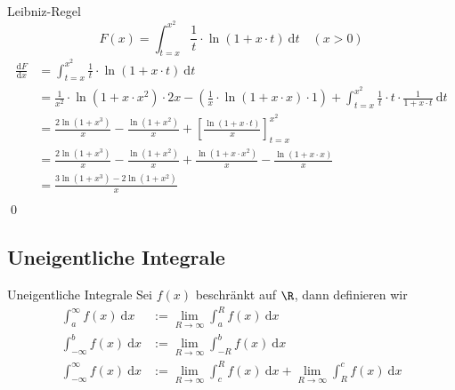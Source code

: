 \documentclass[german]{../spicker}
\newcommand{\dx}{~\mathrm{d}x}
\newcommand{\dt}{~\mathrm{d}t}
\newcommand{\dFdx}{\frac{\mathrm{d}F}{\mathrm{d}x}}
\begin{document}
\begin{example}{Leibniz-Regel}
    $$F(x) = \int_{t=x}^{x^2} \frac{1}{t} \cdot \ln (1 + x\cdot t) \dt \quad (x>0)$$
    $$
        \begin{aligned}
            \dFdx
             & ={} \int_{t=x}^{x^2} \frac{1}{t} \cdot \ln (1 + x\cdot t) \dt                                                                                                                                \\
             & ={} \frac{1}{x^2} \cdot \ln (1 + x\cdot x^2) \cdot 2x - \left( \frac{1}{x} \cdot \ln (1 + x\cdot x) \cdot 1 \right) + \int^{x^2}_{t=x} \frac{1}{t} \cdot t \cdot \frac{1}{1 + x \cdot t} \dt \\
             & ={} \frac{2\ln (1 + x^3)}{x} - \frac{\ln(1+x^2)}{x} + \left[ \frac{\ln(1+x\cdot t)}{x} \right]^{x^2}_{t=x}                                                                                   \\
             & ={} \frac{2\ln (1 + x^3)}{x} - \frac{\ln(1+x^2)}{x} + \frac{\ln(1+x\cdot x^2)}{x} - \frac{\ln(1+x\cdot x)}{x}                                                                                \\
             & ={} \frac{3\ln (1 + x^3) - 2\ln(1+x^2)}{x}                                                                                                                                                   \\
        \end{aligned}
    $$\qed
\end{example}

\subsection{Uneigentliche Integrale}

\begin{defi}{Uneigentliche Integrale}
    Sei $f(x)$ beschränkt auf $\R$, dann definieren wir
    $$
        \begin{aligned}
            \int^\infty_a f(x) \dx         & := \lim_{R\to\infty} \int^R_a f(x)\dx                                          \\
            \int^b_{-\infty} f(x) \dx      & := \lim_{R\to\infty} \int^b_{-R} f(x)\dx                                       \\
            \int^\infty_{-\infty} f(x) \dx & := \lim_{R\to\infty} \int^R_{c} f(x)\dx + \lim_{R\to\infty} \int^c_{R} f(x)\dx
        \end{aligned}
    $$
\end{defi}
\end{document}
